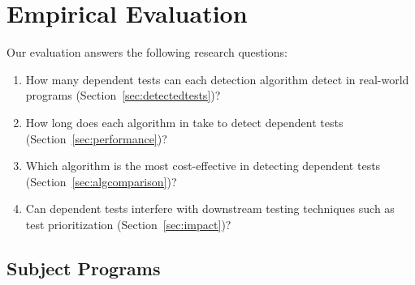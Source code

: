\section{Empirical Evaluation}
\label{sec:evaluation}


\newcommand{\jt}{Joda-Time\xspace}

\newcommand{\jfreecharttests}{2234\xspace}%
\newcommand{\jodatimetests}{3875\xspace}
\newcommand{\xmlsecuritytests}{108\xspace}
\newcommand{\crystaltests}{75\xspace}
\newcommand{\synoptictests}{118\xspace}
\newcommand{\totaltests}{4176\xspace}

\newcommand{\jfreechartautotests}{2946\xspace}
\newcommand{\jodatimeautotests}{2639\xspace}
\newcommand{\xmlsecurityautotests}{665\xspace}
\newcommand{\crystalautotests}{3198\xspace}
\newcommand{\synopticautotests}{2467\xspace}
\newcommand{\totalautotests}{8969\xspace}




Our evaluation answers the following research questions:

\vspace{-1mm}

\begin{enumerate}
\vspace{-1mm}
\item How many dependent tests can each detection
algorithm detect in
real-world programs (Section~\ref{sec:detectedtests})?

\item How long does each algorithm in \ourtool take to detect dependent
tests (Section~\ref{sec:performance})?

\item Which algorithm is the most cost-effective in detecting
dependent tests (Section~\ref{sec:algcomparison})?

\item Can dependent tests interfere with downstream testing techniques
such as test prioritization (Section~\ref{sec:impact})?

\end{enumerate}

\subsection{Subject Programs}


